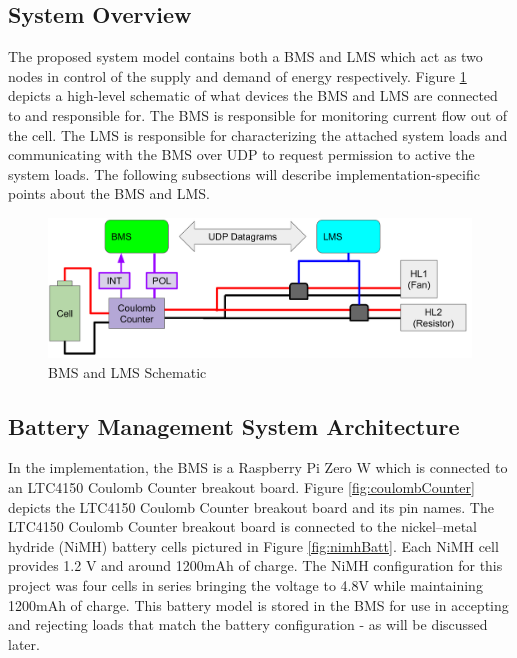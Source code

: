 \documentclass[11pt,conference,draftcls,onecolumn]{IEEEtran}
\begin{document}
\subsection{System Overview}
The proposed system model contains both a BMS and LMS which act as two nodes in control of the supply and demand of energy respectively.
Figure \ref{fig:bmsModel} depicts a high-level schematic of what devices the BMS and LMS are connected to and responsible for.
The BMS is responsible for monitoring current flow out of the cell.
The LMS is responsible for characterizing the attached system loads and communicating with the BMS over UDP to request permission to active the system loads.
The following subsections will describe implementation-specific points about the BMS and LMS.
\begin{figure}
    \centering
    \includegraphics[width=6.5in]{img/uBmsModel.png}
    \caption{BMS and LMS Schematic}
    \label{fig:bmsModel}
\end{figure}

\subsection{Battery Management System Architecture}
In the implementation, the BMS is a Raspberry Pi Zero W \cite{rpiZeroW} which is connected to an LTC4150 Coulomb Counter breakout board.
Figure \ref{fig:coulombCounter} depicts the LTC4150 Coulomb Counter breakout board and its pin names.
The LTC4150 Coulomb Counter breakout board is connected to the nickel–metal hydride (NiMH) battery cells pictured in Figure \ref{fig:nimhBatt}.
Each NiMH cell provides 1.2 V and around 1200mAh of charge.
The NiMH configuration for this project was four cells in series bringing the voltage to 4.8V while maintaining 1200mAh of charge.
This battery model is stored in the BMS for use in accepting and rejecting loads that match the battery configuration - as will be discussed later.
\end{document}
